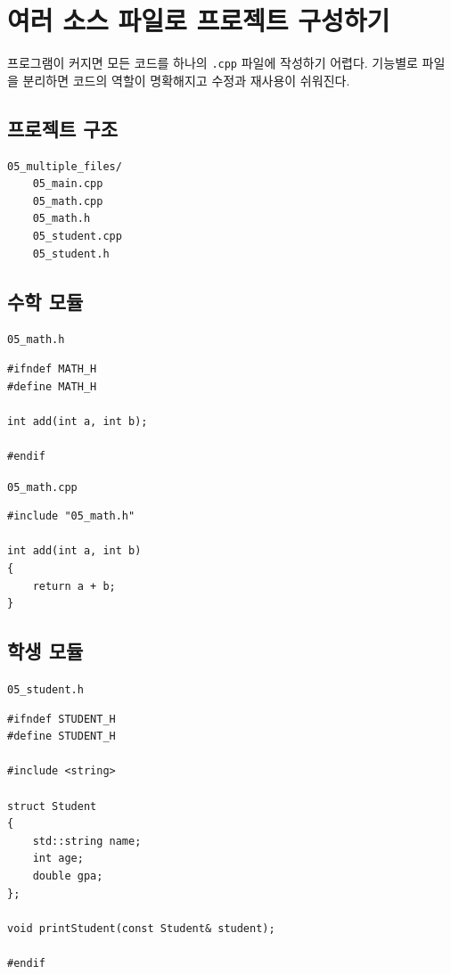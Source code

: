 \documentclass[11pt,a4paper]{article}
\begin{document}
\section{여러 소스 파일로 프로젝트 구성하기}

프로그램이 커지면 모든 코드를 하나의 \texttt{.cpp} 파일에 작성하기 어렵다.
기능별로 파일을 분리하면 코드의 역할이 명확해지고 수정과 재사용이 쉬워진다.

\subsection{프로젝트 구조}

\begin{verbatim}
05_multiple_files/
    05_main.cpp
    05_math.cpp
    05_math.h
    05_student.cpp
    05_student.h
\end{verbatim}

\subsection{수학 모듈}

\texttt{05\_math.h}

\begin{lstlisting}
#ifndef MATH_H
#define MATH_H

int add(int a, int b);

#endif
\end{lstlisting}

\texttt{05\_math.cpp}

\begin{lstlisting}
#include "05_math.h"

int add(int a, int b)
{
    return a + b;
}
\end{lstlisting}

\subsection{학생 모듈}

\texttt{05\_student.h}

\begin{lstlisting}
#ifndef STUDENT_H
#define STUDENT_H

#include <string>

struct Student
{
    std::string name;
    int age;
    double gpa;
};

void printStudent(const Student& student);

#endif
\end{lstlisting}
\end{document}
